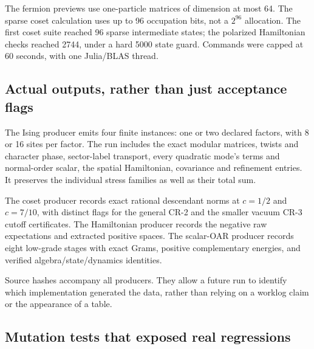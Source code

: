 The fermion previews use one-particle matrices of dimension at most 64.
The sparse coset calculation uses up to 96 occupation bits, not a
$2^{96}$ allocation. The first coset suite reached 96 sparse intermediate
states; the polarized Hamiltonian checks reached 2744, under a hard 5000
state guard. Commands were capped at 60 seconds, with one Julia/BLAS thread.

\subsection{Actual outputs, rather than just acceptance flags}

The Ising producer emits four finite instances: one or two declared factors,
with 8 or 16 sites per factor. The run includes the exact modular matrices,
twists and character phase, sector-label transport, every quadratic mode's
terms and normal-order scalar, the spatial Hamiltonian, covariance and
refinement entries. It preserves the individual stress families as well as
their total sum.

The coset producer records exact rational descendant norms at $c=1/2$ and
$c=7/10$, with distinct flags for the general CR-2 and the smaller vacuum
CR-3 cutoff certificates. The Hamiltonian producer records the negative raw
expectations and extracted positive spaces. The scalar-OAR producer records
eight low-grade stages with exact Grams, positive complementary energies,
and verified algebra/state/dynamics identities.

Source hashes accompany all producers. They allow a future run to identify
which implementation generated the data, rather than relying on a worklog
claim or the appearance of a table.

\subsection{Mutation tests that exposed real regressions}

